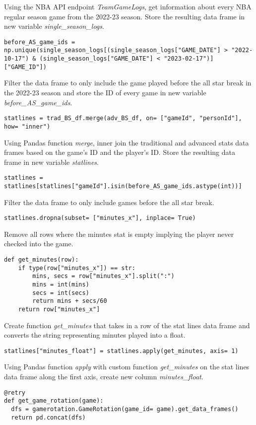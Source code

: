 \documentclass{article}
\begin{document}
Using the NBA API endpoint \textit{TeamGameLogs}, get information about every NBA regular season game from the 2022-23 season. Store the resulting data frame in new variable \textit{single_season_logs}.
\begin{lstlisting}
before_AS_game_ids = np.unique(single_season_logs[(single_season_logs["GAME_DATE"] > "2022-10-17") & (single_season_logs["GAME_DATE"] < "2023-02-17")]["GAME_ID"])
\end{lstlisting}
Filter the data frame to only include the game played before the all star break in the 2022-23 season and store the ID of every game in new variable \textit{before_AS_game_ids}.
\begin{lstlisting}
statlines = trad_BS_df.merge(adv_BS_df, on= ["gameId", "personId"], how= "inner")
\end{lstlisting}
Using Pandas function \textit{merge}, inner join the traditional and advanced stats data frames based on the game's ID and the player's ID. Store the resulting data frame in new variable \textit{statlines}.
\begin{lstlisting}
statlines = statlines[statlines["gameId"].isin(before_AS_game_ids.astype(int))]
\end{lstlisting}
Filter the data frame to only include games before the all star break.
\begin{lstlisting}
statlines.dropna(subset= ["minutes_x"], inplace= True)
\end{lstlisting}
Remove all rows where the minutes stat is empty implying the player never checked into the game.
\begin{lstlisting}
def get_minutes(row):
    if type(row["minutes_x"]) == str:
        mins, secs = row["minutes_x"].split(":")
        mins = int(mins)
        secs = int(secs)
        return mins + secs/60
    return row["minutes_x"]
\end{lstlisting}
Create function \textit{get_minutes} that takes in a row of the stat lines data frame and converts the string representing minutes played into a float.
\begin{lstlisting}
statlines["minutes_float"] = statlines.apply(get_minutes, axis= 1)
\end{lstlisting}
Using Pandas function \textit{apply} with custom function \textit{get_minutes} on the stat lines data frame along the first axis, create new column \textit{minutes_float}.
\begin{lstlisting}
@retry
def get_game_rotation(game):
  dfs = gamerotation.GameRotation(game_id= game).get_data_frames()
  return pd.concat(dfs)
\end{lstlisting}
\end{document}
